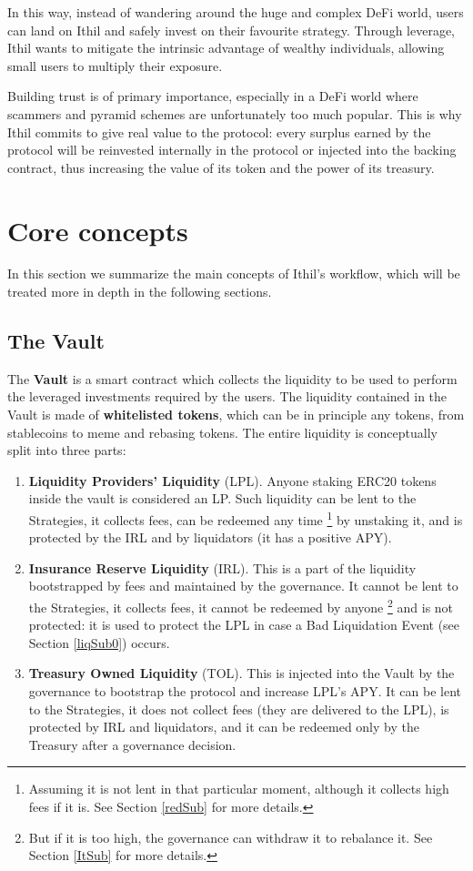 \documentclass[a4paper,10 pt]{article}
\theoremstyle{definition}
\begin{document}
In this way, instead of wandering around the huge and complex DeFi world, users can land on Ithil and safely invest on their favourite strategy. Through leverage, Ithil wants to mitigate the intrinsic advantage of wealthy individuals, allowing small users to multiply their exposure.

Building trust is of primary importance, especially in a DeFi world where scammers and pyramid schemes are unfortunately too much popular. This is why Ithil commits to give real value to the protocol: every surplus earned by the protocol will be reinvested internally in the protocol or injected into the backing contract, thus increasing the value of its token and the power of its treasury. 

\section{Core concepts}\label{coreSec}
In this section we summarize the main concepts of Ithil's workflow, which will be treated more in depth in the following sections. 
\subsection{The Vault}\label{vaultSub}
The {\bf Vault} is a smart contract which collects the liquidity to be used to perform the leveraged investments required by the users. The liquidity contained in the Vault is made of {\bf whitelisted tokens}, which can be in principle any tokens, from stablecoins to meme and rebasing tokens. The entire liquidity is conceptually split into three parts:
\begin{enumerate}
\item {\bf Liquidity Providers' Liquidity} (LPL). Anyone staking ERC20 tokens inside the vault is considered an LP. Such liquidity can be lent to the Strategies, it collects fees, can be redeemed any time \footnote{Assuming it is not lent in that particular moment, although it collects high fees if it is. See Section \ref{redSub} for more details.} by unstaking it, and is protected by the IRL and by liquidators (it has a positive APY).
\item {\bf Insurance Reserve Liquidity} (IRL). This is a part of the liquidity bootstrapped by fees and maintained by the governance. It cannot be lent to the Strategies, it collects fees, it cannot be redeemed by anyone \footnote{But if it is too high, the governance can withdraw it to rebalance it. See Section \ref{ItSub} for more details.} and is not protected: it is used to protect the LPL in case a Bad Liquidation Event (see Section \ref{liqSub0}) occurs.
\item {\bf Treasury Owned Liquidity} (TOL). This is injected into the Vault by the governance to bootstrap the protocol and increase LPL's APY. It can be lent to the Strategies, it does not collect fees (they are delivered to the LPL), is protected by IRL and liquidators, and it can be redeemed only by the Treasury after a governance decision.
\end{enumerate}
\end{document}
